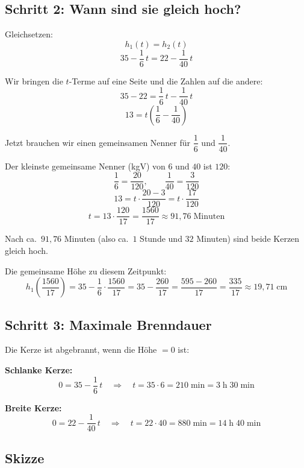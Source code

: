 \documentclass[12pt,a4paper]{article}
\begin{document}
\subsection{Schritt 2: Wann sind sie gleich hoch?}

Gleichsetzen:
\[
  h_1(t) = h_2(t)
\]
\[
  35 - \frac{1}{6}\,t = 22 - \frac{1}{40}\,t
\]

Wir bringen die $t$-Terme auf eine Seite und die Zahlen auf die andere:
\[
  35 - 22 = \frac{1}{6}\,t - \frac{1}{40}\,t
\]
\[
  13 = t\left(\frac{1}{6} - \frac{1}{40}\right)
\]

Jetzt brauchen wir einen gemeinsamen Nenner f\"ur $\dfrac{1}{6}$ und $\dfrac{1}{40}$.

Der kleinste gemeinsame Nenner (kgV) von $6$ und $40$ ist $120$:
\[
  \frac{1}{6} = \frac{20}{120}, \qquad \frac{1}{40} = \frac{3}{120}
\]
\[
  13 = t \cdot \frac{20 - 3}{120} = t \cdot \frac{17}{120}
\]
\[
  t = 13 \cdot \frac{120}{17} = \frac{1560}{17} \approx 91{,}76\;\text{Minuten}
\]

\begin{merkbox}[title={Ergebnis}]
Nach ca.\ $91{,}76$ Minuten (also ca.\ $1$ Stunde und $32$ Minuten) sind beide Kerzen gleich hoch.

Die gemeinsame H\"ohe zu diesem Zeitpunkt:
\[
  h_1\!\left(\frac{1560}{17}\right) = 35 - \frac{1}{6}\cdot\frac{1560}{17} = 35 - \frac{260}{17} = \frac{595 - 260}{17} = \frac{335}{17} \approx 19{,}71\;\text{cm}
\]
\end{merkbox}

\subsection{Schritt 3: Maximale Brenndauer}

Die Kerze ist abgebrannt, wenn die H\"ohe $= 0$ ist:

\textbf{Schlanke Kerze:}
\[
  0 = 35 - \frac{1}{6}\,t \quad\Longrightarrow\quad t = 35 \cdot 6 = 210\;\text{min} = 3\;\text{h}\;30\;\text{min}
\]

\textbf{Breite Kerze:}
\[
  0 = 22 - \frac{1}{40}\,t \quad\Longrightarrow\quad t = 22 \cdot 40 = 880\;\text{min} = 14\;\text{h}\;40\;\text{min}
\]

\subsection{Skizze}
\end{document}
